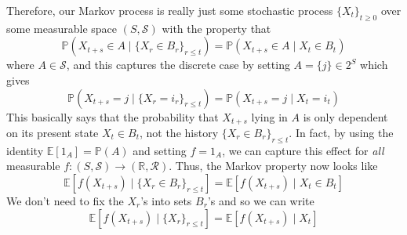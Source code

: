 \documentclass{article}
\theoremstyle{definition}
\theoremstyle{remark}
\theoremstyle{definition}
\begin{document}
Therefore, our Markov process is really just some stochastic process $\{X_t\}_{t \geq 0}$ over some measurable space $(S, \mathcal{S})$ with the property that 
\[\mathbb{P}(X_{t + s} \in A \mid \{X_r \in B_r\}_{r \leq t}) = \mathbb{P}( X_{t + s} \in A \mid X_t \in B_t)\]
where $A \in \mathcal{S}$, and this captures the discrete case by setting $A = \{j\} \in 2^S$ which gives 
\[\mathbb{P}( X_{t + s} = j \mid \{X_r = i_r\}_{r \leq t}) = \mathbb{P}( X_{t + s} = j \mid X_t = i_t)\]
This basically says that the probability that $X_{t + s}$ lying in $A$ is only dependent on its present state $X_t \in B_t$, not the history $\{X_r \in B_r\}_{r \leq t}$. In fact, by using the identity $\mathbb{E}[1_A] = \mathbb{P}(A)$ and setting $f = 1_A$, we can capture this effect for \textit{all} measurable $f: (S, \mathcal{S}) \rightarrow (\mathbb{R}, \mathcal{R})$. Thus, the Markov property now looks like  
\[\mathbb{E}[f (X_{t + s}) \mid \{X_r \in B_r\}_{r \leq t}] = \mathbb{E}[ f(X_{t + s}) \mid X_t \in B_t]\]
We don't need to fix the $X_r$'s into sets $B_r$'s and so we can write 
\[\mathbb{E}[f (X_{t + s}) \mid \{X_r\}_{r \leq t}] = \mathbb{E}[ f(X_{t + s}) \mid X_t]\]
\end{document}

